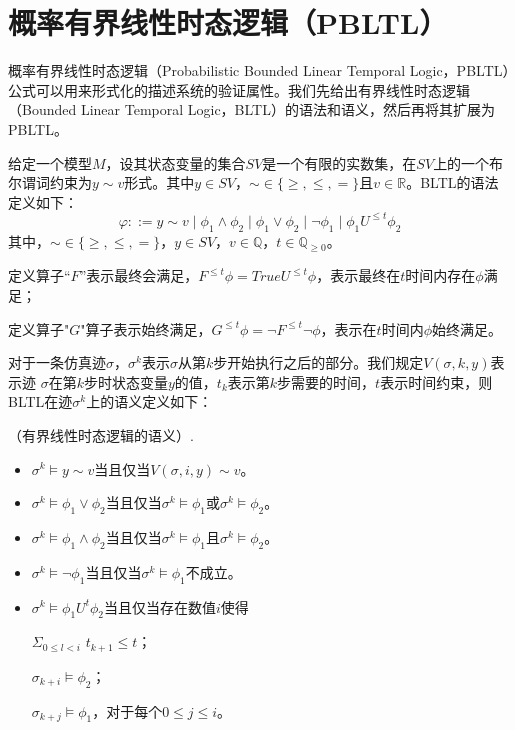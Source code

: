 \section{概率有界线性时态逻辑（PBLTL）}
概率有界线性时态逻辑（Probabilistic Bounded Linear Temporal Logic，PBLTL）\cite{David2012Statistical}公式可以用来形式化的描述系统的验证属性。我们先给出有界线性时态逻辑（Bounded Linear Temporal Logic，BLTL）的语法和语义，然后再将其扩展为PBLTL。

给定一个模型$M$，设其状态变量的集合$SV$是一个有限的实数集，在$SV$上的一个布尔谓词约束为$y \sim v$形式。其中$y\in SV$，$\sim \in \lbrace \geq,\leq,=\rbrace$且$v\in \mathbb{R}$。BLTL的语法定义如下：
$$\varphi ::= y \sim v\mid\phi_{1}\wedge\phi_{2}\mid\phi_{1}\vee\phi_{2}\mid \neg \phi_{1}\mid\phi_{1}U^{\leq t}\phi_{2}
$$
其中，$\sim \in \lbrace \geq,\leq,=\rbrace$，$y\in SV$，$v\in \mathbb{Q}$，$t\in \mathbb{Q}_{\geq 0}$。

定义算子“$F$”表示最终会满足，$F^{\leq t}\phi = True U^{\leq t}\phi$，表示最终在$t$时间内存在$\phi$满足；

定义算子"$G$"算子表示始终满足，$G^{\leq t}\phi = \neg F^{\leq t}\neg \phi$，表示在$t$时间内$\phi$始终满足。

对于一条仿真迹$\sigma$，$\sigma^k$表示$\sigma$从第$k$步开始执行之后的部分。我们规定$V(\sigma,k,y)$表示迹 $\sigma$在第$k$步时状态变量$y$的值，$t_k$表示第$k$步需要的时间，$t$表示时间约束，则BLTL在迹$\sigma^k$上的语义定义如下：

\begin{define}\label{def:bltl_semantics}
（有界线性时态逻辑的语义）.	
\begin{itemize}
\item $\sigma^{k}\vDash y \sim v $当且仅当$V(\sigma,i,y)\sim v$。
\item $\sigma^{k}\vDash\phi_{1}\vee\phi_{2}$当且仅当$\sigma^{k}\vDash\phi_{1}$或$\sigma^{k}\vDash\phi_{2}$。
\item $\sigma^{k}\vDash\phi_{1}\wedge\phi_{2}$当且仅当$\sigma^{k}\vDash\phi_{1}$且$\sigma^{k}\vDash\phi_{2}$。
\item $\sigma^{k}\vDash\neg\phi_{1}$当且仅当$\sigma^{k}\vDash\phi_{1}$不成立。
\item $\sigma^{k}\vDash\phi_{1}U^{t}\phi_{2}$当且仅当存在数值$i$使得

$ \Sigma_{0\leq l<i}$ $t_{k+1}\leq t$；

$ \sigma_{k+i}\models\phi_{2}$；

$\sigma_{k+j}\models\phi_{1}$，对于每个$ 0\leq j \leq i$。
\end{itemize}
\end{define}

